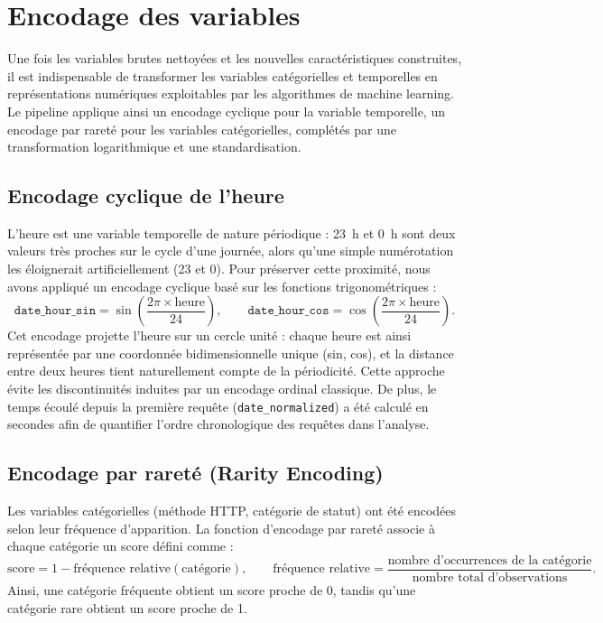 \documentclass[a4paper,12pt]{article}
\begin{document}
\section{Encodage des variables}

Une fois les variables brutes nettoyées et les nouvelles caractéristiques construites, il est indispensable de transformer les variables catégorielles et temporelles en représentations numériques exploitables par les algorithmes de machine learning. Le pipeline applique ainsi un encodage cyclique pour la variable temporelle, un encodage par rareté pour les variables catégorielles, complétés par une transformation logarithmique et une standardisation.

\subsection{Encodage cyclique de l'heure}

L'heure est une variable temporelle de nature périodique : 23~h et 0~h sont deux valeurs très proches sur le cycle d'une journée, alors qu'une simple numérotation les éloignerait artificiellement (23 et 0). Pour préserver cette proximité, nous avons appliqué un encodage cyclique basé sur les fonctions trigonométriques :
\begin{equation}
  \texttt{date\_hour\_sin} = \sin\!\left(\frac{2\pi \times \text{heure}}{24}\right), \qquad
  \texttt{date\_hour\_cos} = \cos\!\left(\frac{2\pi \times \text{heure}}{24}\right).
\end{equation}
Cet encodage projette l'heure sur un cercle unité : chaque heure est ainsi représentée par une coordonnée bidimensionnelle unique (sin, cos), et la distance entre deux heures tient naturellement compte de la périodicité. Cette approche évite les discontinuités induites par un encodage ordinal classique. De plus, le temps écoulé depuis la première requête (\texttt{date\_normalized}) a été calculé en secondes afin de quantifier l'ordre chronologique des requêtes dans l'analyse.

\subsection{Encodage par rareté (Rarity Encoding)}

Les variables catégorielles (méthode HTTP, catégorie de statut) ont été encodées selon leur fréquence d'apparition. La fonction d'encodage par rareté associe à chaque catégorie un score défini comme :
\begin{equation}
  \text{score} = 1 - \text{fréquence relative}(\text{catégorie}), \qquad
  \text{fréquence relative} = \frac{\text{nombre d'occurrences de la catégorie}}{\text{nombre total d'observations}}.
\end{equation}
Ainsi, une catégorie fréquente obtient un score proche de 0, tandis qu'une catégorie rare obtient un score proche de 1.
\end{document}
